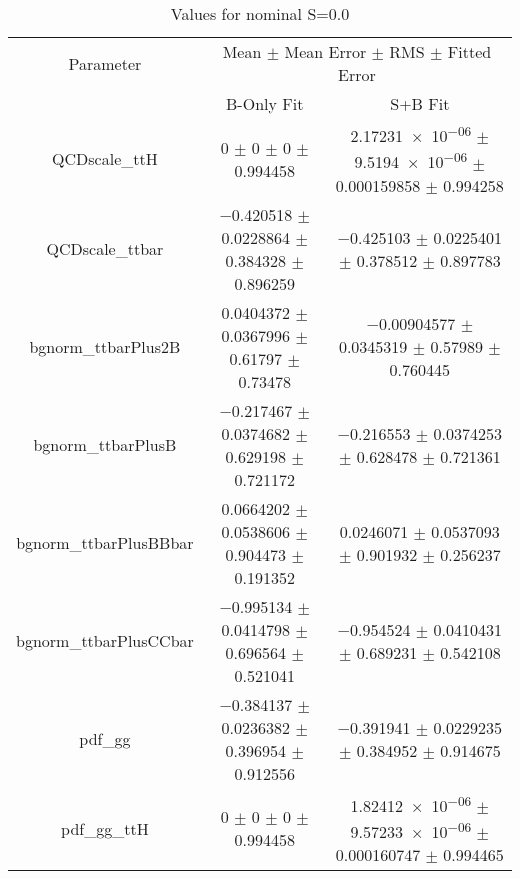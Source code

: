 \begin{table}
\centering
\caption{Values for nominal S=0.0}
\begin{tabular}{ccc}
\toprule
Parameter & \multicolumn{2}{c}{Mean $\pm$ Mean Error $\pm$ RMS $\pm$ Fitted Error}\\
 & B-Only Fit & S+B Fit\\
\midrule
QCDscale\_ttH & \num{0} $\pm$ \num{0} $\pm$ \num{0} $\pm$ \num{0.994458} & \num{2.17231e-06} $\pm$ \num{9.5194e-06} $\pm$ \num{0.000159858} $\pm$ \num{0.994258}\\
QCDscale\_ttbar & \num{-0.420518} $\pm$ \num{0.0228864} $\pm$ \num{0.384328} $\pm$ \num{0.896259} & \num{-0.425103} $\pm$ \num{0.0225401} $\pm$ \num{0.378512} $\pm$ \num{0.897783}\\
bgnorm\_ttbarPlus2B & \num{0.0404372} $\pm$ \num{0.0367996} $\pm$ \num{0.61797} $\pm$ \num{0.73478} & \num{-0.00904577} $\pm$ \num{0.0345319} $\pm$ \num{0.57989} $\pm$ \num{0.760445}\\
bgnorm\_ttbarPlusB & \num{-0.217467} $\pm$ \num{0.0374682} $\pm$ \num{0.629198} $\pm$ \num{0.721172} & \num{-0.216553} $\pm$ \num{0.0374253} $\pm$ \num{0.628478} $\pm$ \num{0.721361}\\
bgnorm\_ttbarPlusBBbar & \num{0.0664202} $\pm$ \num{0.0538606} $\pm$ \num{0.904473} $\pm$ \num{0.191352} & \num{0.0246071} $\pm$ \num{0.0537093} $\pm$ \num{0.901932} $\pm$ \num{0.256237}\\
bgnorm\_ttbarPlusCCbar & \num{-0.995134} $\pm$ \num{0.0414798} $\pm$ \num{0.696564} $\pm$ \num{0.521041} & \num{-0.954524} $\pm$ \num{0.0410431} $\pm$ \num{0.689231} $\pm$ \num{0.542108}\\
pdf\_gg & \num{-0.384137} $\pm$ \num{0.0236382} $\pm$ \num{0.396954} $\pm$ \num{0.912556} & \num{-0.391941} $\pm$ \num{0.0229235} $\pm$ \num{0.384952} $\pm$ \num{0.914675}\\
pdf\_gg\_ttH & \num{0} $\pm$ \num{0} $\pm$ \num{0} $\pm$ \num{0.994458} & \num{1.82412e-06} $\pm$ \num{9.57233e-06} $\pm$ \num{0.000160747} $\pm$ \num{0.994465}\\
\bottomrule
\end{tabular}
\end{table}